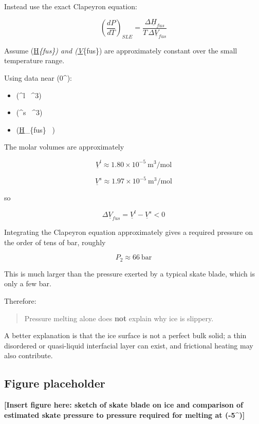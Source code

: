 \documentclass[
  letterpaper,
  DIV=11,
  numbers=noendperiod]{scrartcl}
\providecommand{\tightlist}{%
  \setlength{\itemsep}{0pt}\setlength{\parskip}{0pt}}
\begin{document}
Instead use the exact Clapeyron equation:

\[
\left(\frac{dP}{dT}\right)_{SLE}
=
\frac{\Delta \underline{H}_{fus}}{T\,\Delta \underline{V}_{fus}}
\]

Assume (\Delta \underline{H}\emph{\{fus\}) and
(\Delta \underline{V}}\{fus\}) are approximately constant over the small
temperature range.

Using data near (0\^{}\circ{}):

\begin{itemize}
\tightlist
\item
  (\rho\^{}l ~\^{}3)
\item
  (\rho\^{}s ~\^{}3)
\item
  (\Delta \underline{H}\_\{fus\} ~)
\end{itemize}

The molar volumes are approximately

\[
\underline{V}^l \approx 1.80\times10^{-5}\ \text{m}^3/\text{mol}
\]

\[
\underline{V}^s \approx 1.97\times10^{-5}\ \text{m}^3/\text{mol}
\]

so

\[
\Delta \underline{V}_{fus} = \underline{V}^l-\underline{V}^s < 0
\]

Integrating the Clapeyron equation approximately gives a required
pressure on the order of tens of bar, roughly

\[
P_2 \approx 66\ \text{bar}
\]

This is much larger than the pressure exerted by a typical skate blade,
which is only a few bar.

Therefore:

\begin{quote}
Pressure melting alone does \textbf{not} explain why ice is slippery.
\end{quote}

A better explanation is that the ice surface is not a perfect bulk
solid; a thin disordered or quasi-liquid interfacial layer can exist,
and frictional heating may also contribute.

\subsection{Figure placeholder}\label{figure-placeholder-3}

\textbf{{[}Insert figure here: sketch of skate blade on ice and
comparison of estimated skate pressure to pressure required for melting
at (-5\^{}\circ{}){]}}
\end{document}
